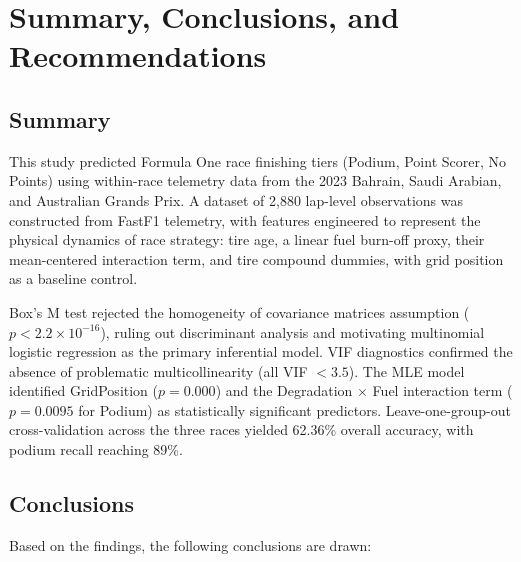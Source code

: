 \section{Summary, Conclusions, and Recommendations}

\subsection{Summary}

This study predicted Formula One race finishing tiers (Podium, Point Scorer,
No Points) using within-race telemetry data from the 2023 Bahrain, Saudi
Arabian, and Australian Grands Prix. A dataset of 2,880 lap-level
observations was constructed from FastF1 telemetry, with features engineered
to represent the physical dynamics of race strategy: tire age, a linear fuel
burn-off proxy, their mean-centered interaction term, and tire compound
dummies, with grid position as a baseline control.

Box's M test rejected the homogeneity of covariance matrices assumption
($p < 2.2 \times 10^{-16}$), ruling out discriminant analysis and
motivating multinomial logistic regression as the primary inferential model.
VIF diagnostics confirmed the absence of problematic multicollinearity (all
VIF $< 3.5$). The MLE model identified GridPosition ($p = 0.000$) and the
Degradation $\times$ Fuel interaction term ($p = 0.0095$ for Podium) as
statistically significant predictors. Leave-one-group-out cross-validation
across the three races yielded 62.36\% overall accuracy, with podium recall
reaching 89\%.

\subsection{Conclusions}

Based on the findings, the following conclusions are drawn:

